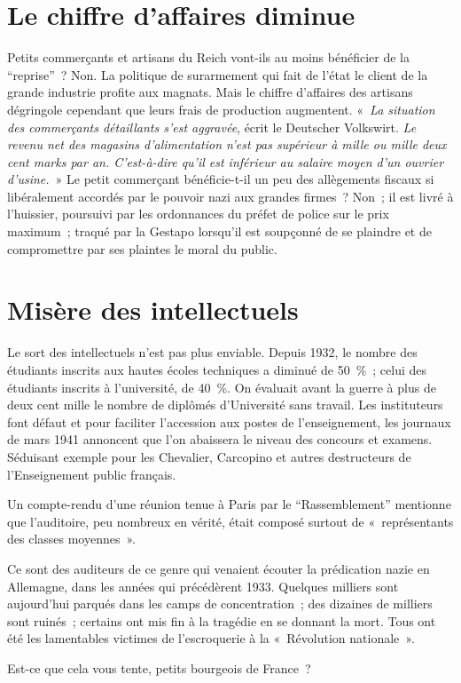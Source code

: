 \documentclass[french,twoside]{book} %
\newcommand\chapterclose{} %
\begin{document}
\section[{Le chiffre d’affaires diminue}]{Le chiffre d’affaires diminue}
\noindent Petits commerçants et artisans du Reich vont-ils au moins bénéficier de la “reprise” ? Non. La politique de surarmement qui fait de l’état le client de la grande industrie profite aux magnats. Mais le chiffre d’affaires des artisans dégringole cependant que leurs frais de production augmentent. « \emph{La situation des commerçants détaillants s’est aggravée}, écrit le Deutscher Volkswirt. \emph{Le revenu net des magasins d’alimentation n’est pas supérieur à mille ou mille deux cent marks par an. C’est-à-dire qu’il est inférieur au salaire moyen d’un ouvrier d’usine.} » Le petit commerçant bénéficie-t-il un peu des allègements fiscaux si libéralement accordés par le pouvoir nazi aux grandes firmes ? Non ; il est livré à l’huissier, poursuivi par les ordonnances du préfet de police sur le prix maximum ; traqué par la Gestapo lorsqu’il est soupçonné de se plaindre et de compromettre par ses plaintes le moral du public.
\section[{Misère des intellectuels}]{Misère des intellectuels}
\noindent Le sort des intellectuels n’est pas plus enviable. Depuis 1932, le nombre des étudiants inscrits aux hautes écoles techniques a diminué de 50 \% ; celui des étudiants inscrits à l’université, de 40 \%. On évaluait avant la guerre à plus de deux cent mille le nombre de diplômés d’Université sans travail. Les instituteurs font défaut et pour faciliter l’accession aux postes de l’enseignement, les journaux de mars 1941 annoncent que l’on abaissera le niveau des concours et examens. Séduisant exemple pour les Chevalier, Carcopino et autres destructeurs de l’Enseignement public français.\par
Un compte-rendu d’une réunion tenue à Paris par le “Rassemblement” mentionne que l’auditoire, peu nombreux en vérité, était composé surtout de « représentants des classes moyennes ».\par
Ce sont des auditeurs de ce genre qui venaient écouter la prédication nazie en Allemagne, dans les années qui précédèrent 1933. Quelques milliers sont aujourd’hui parqués dans les camps de concentration ; des dizaines de milliers sont ruinés ; certains ont mis fin à la tragédie en se donnant la mort. Tous ont été les lamentables victimes de l’escroquerie à la « Révolution nationale ».\par
Est-ce que cela vous tente, petits bourgeois de France ?
\chapterclose
\end{document}
